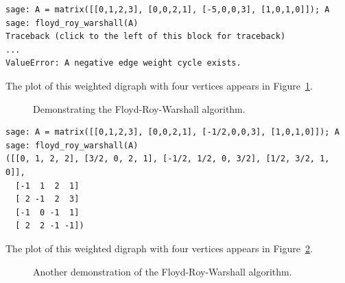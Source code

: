 %
%
%
%

\begin{lstlisting}
sage: A = matrix([[0,1,2,3], [0,0,2,1], [-5,0,0,3], [1,0,1,0]]); A
sage: floyd_roy_warshall(A)
Traceback (click to the left of this block for traceback)
...
ValueError: A negative edge weight cycle exists.
\end{lstlisting}

The plot of this weighted digraph with four vertices appears in
Figure~\ref{fig:graph_algorithms:Floyd_Roy_Warshall_demo}.

\begin{figure}[!htbp]
\centering
{}

\caption{Demonstrating the Floyd-Roy-Warshall algorithm.}
\label{fig:graph_algorithms:Floyd_Roy_Warshall_demo}
\end{figure}

\begin{lstlisting}
sage: A = matrix([[0,1,2,3], [0,0,2,1], [-1/2,0,0,3], [1,0,1,0]]); A
sage: floyd_roy_warshall(A)
([[0, 1, 2, 2], [3/2, 0, 2, 1], [-1/2, 1/2, 0, 3/2], [1/2, 3/2, 1, 0]],
  [-1  1  2  1]
  [ 2 -1  2  3]
  [-1  0 -1  1]
  [ 2  2 -1 -1])
\end{lstlisting}

The plot of this weighted digraph with four vertices appears in
Figure~\ref{fig:graph_algorithms:another_Floyd_Roy_Warshall_demo}.

\begin{figure}[!htbp]
\centering

\caption{Another demonstration of the Floyd-Roy-Warshall algorithm.}
\label{fig:graph_algorithms:another_Floyd_Roy_Warshall_demo}
\end{figure}

